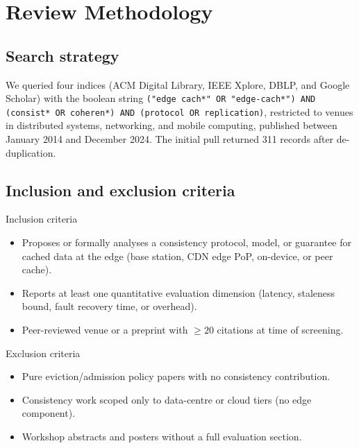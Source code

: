 \section{Review Methodology}
\label{sec:methodology}

\subsection{Search strategy}

We queried four indices (ACM Digital Library, IEEE Xplore, DBLP, and Google Scholar) with the boolean
string \texttt{("edge cach*" OR "edge-cach*") AND (consist* OR coheren*) AND (protocol OR
replication)}, restricted to venues in distributed systems, networking, and mobile computing, published
between January 2014 and December 2024. The initial pull returned 311 records after de-duplication.

\subsection{Inclusion and exclusion criteria}

\begin{themebox}{Inclusion criteria}
\begin{itemize}
  \item Proposes or formally analyses a consistency protocol, model, or guarantee for cached data
        at the edge (base station, CDN edge PoP, on-device, or peer cache).
  \item Reports at least one quantitative evaluation dimension (latency, staleness bound, fault
        recovery time, or overhead).
  \item Peer-reviewed venue or a preprint with $\geq 20$ citations at time of screening.
\end{itemize}
\end{themebox}

\begin{themebox}{Exclusion criteria}
\begin{itemize}
  \item Pure eviction/admission policy papers with no consistency contribution.
  \item Consistency work scoped only to data-centre or cloud tiers (no edge component).
  \item Workshop abstracts and posters without a full evaluation section.
\end{itemize}
\end{themebox}

